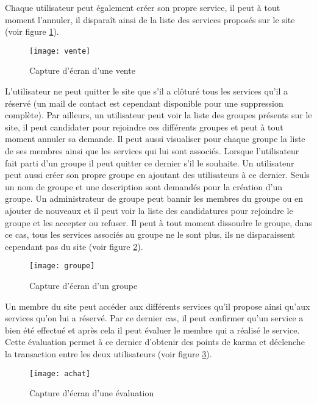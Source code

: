 Chaque utilisateur peut également créer son propre service, il peut à tout moment l'annuler, il disparaît ainsi de la liste des services proposés sur le site (voir figure \ref{fig:Vente}).

\begin{figure}[h!]
\centering
\texttt{[image: vente]}
\caption{Capture d'écran d'une vente}
\label{fig:Vente}
\end{figure}

L'utilisateur ne peut quitter le site que s'il a clôturé tous les services qu'il a réservé (un mail de contact est cependant disponible pour une suppression complète).
Par ailleurs, un utilisateur peut voir la liste des groupes présents sur le site, il peut candidater pour rejoindre ces différents groupes et peut à tout moment annuler sa demande. Il peut aussi visualiser pour chaque groupe la liste de ses membres ainsi que les services qui lui sont associés.
Lorsque l'utilisateur fait parti d'un groupe il peut quitter ce dernier s'il le souhaite.
Un utilisateur peut aussi créer son propre groupe en ajoutant des utilisateurs à ce dernier. Seuls un nom de groupe et une description sont demandés pour la création d'un groupe.
Un administrateur de groupe peut bannir les membres du groupe ou en ajouter de nouveaux et il peut voir la liste des candidatures pour rejoindre le groupe et les accepter ou refuser.
Il peut à tout moment dissoudre le groupe, dans ce cas, tous les services associés au groupe ne le sont plus, ils ne disparaissent cependant pas du site (voir figure \ref{fig:Groupe}).

\begin{figure}[h!]
\centering
\texttt{[image: groupe]}
\caption{Capture d'écran d'un groupe}
\label{fig:Groupe}
\end{figure}

Un membre du site peut accéder aux différents services qu'il propose ainsi qu'aux services qu'on lui a réservé. Par ce dernier cas, il peut confirmer qu'un service a bien été effectué et après cela il peut évaluer le membre qui a réalisé le service. 
Cette évaluation permet à ce dernier d'obtenir des points de karma et déclenche la transaction entre les deux utilisateurs (voir figure \ref{fig:Evaluation}).

\begin{figure}[h!]
\centering
\texttt{[image: achat]}
\caption{Capture d'écran d'une évaluation}
\label{fig:Evaluation}
\end{figure}


